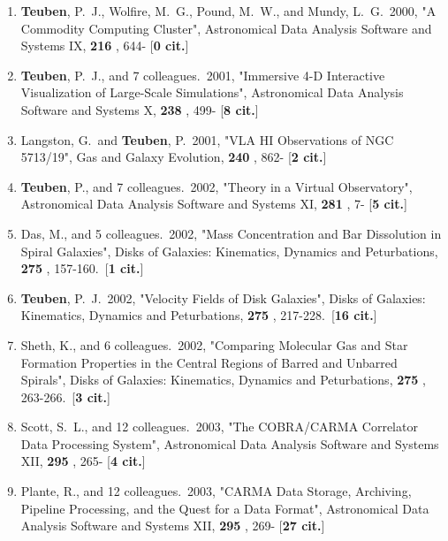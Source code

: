 \documentclass[11pt,letterpaper]{article}
\begin{document}
\begin{enumerate}[resume,label=\textbf{\arabic*}.]
\item  
{\bf Teuben}, P.~J., Wolfire, M.~G., Pound, M.~W., and Mundy, L.~G.\  2000,  "A 
Commodity Computing Cluster", Astronomical Data Analysis Software and 
Systems IX,  {\bf 216} , 644- [{\bf 0 cit.}] 



\item  
{\bf Teuben}, P.~J., and 7 colleagues.\  2001,  "Immersive 4-D Interactive 
Visualization of Large-Scale Simulations", Astronomical Data Analysis 
Software and Systems X,  {\bf 238} , 499- [{\bf 8 cit.}] 

\item  
Langston, G.~and {\bf Teuben}, P.\  2001,  "VLA HI Observations of NGC 5713/19", 
Gas and Galaxy Evolution,  {\bf 240} , 862- [{\bf 2 cit.}] 



\item  
{\bf Teuben}, P., and 7 colleagues.\  2002,  "Theory in a Virtual Observatory", 
Astronomical Data Analysis Software and Systems XI,  {\bf 281} , 7- [{\bf 5 
cit.}] 


\item  
Das, M., and 5 colleagues.\  2002,  "Mass Concentration and Bar Dissolution 
in Spiral Galaxies", Disks of Galaxies: Kinematics, Dynamics and 
Peturbations,  {\bf 275} , 157-160.\  [{\bf 1 cit.}] 

\item  
{\bf Teuben}, P.~J.\  2002,  "Velocity Fields of Disk Galaxies", Disks of 
Galaxies: Kinematics, Dynamics and Peturbations,  {\bf 275} , 217-228.\  
[{\bf 16 cit.}] 

\item  
Sheth, K., and 6 colleagues.\  2002,  "Comparing Molecular Gas and Star 
Formation Properties in the Central Regions of Barred and Unbarred 
Spirals", Disks of Galaxies: Kinematics, Dynamics and Peturbations,  {\bf 
275} , 263-266.\  [{\bf 3 cit.}] 

\item  
Scott, S.~L., and 12 colleagues.\  2003,  "The COBRA/CARMA Correlator Data 
Processing System", Astronomical Data Analysis Software and Systems XII,  
{\bf 295} , 265- [{\bf 4 cit.}] 

\item  
Plante, R., and 12 colleagues.\  2003,  "CARMA Data Storage, Archiving, 
Pipeline Processing, and the Quest for a Data Format", Astronomical Data 
Analysis Software and Systems XII,  {\bf 295} , 269- [{\bf 27 cit.}] 


\end{enumerate}
\end{document}

